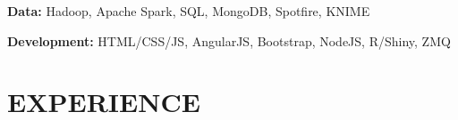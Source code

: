 \documentclass[margin,10pt]{res} %
\begin{document}
\begin{resume}
{\textbf{Data:}} Hadoop, Apache Spark, SQL, MongoDB, Spotfire, KNIME

{\textbf{Development:}} HTML/CSS/JS, AngularJS, Bootstrap, NodeJS, R/Shiny, ZMQ

\section{EXPERIENCE
\newline
\newline
\newline
\newline
\newline
\newline
\newline
\newline
\newline
\newline
\newline
\newline
\newline
\newline
\newline
}


\end{resume}
\end{document}
